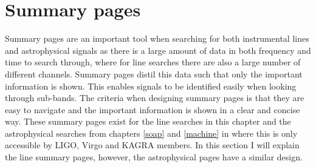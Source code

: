 \section{\label{detchar:summary}Summary pages}

Summary pages are an important tool when searching for both instrumental lines and astrophysical signals as there is a large amount of data in both frequency and time to search through, where for line searches there are also a large number of different channels. Summary pages
distil this data such that only the important information is shown. This
enables signals to be identified easily when looking through sub-bands. The
criteria when designing summary pages is that they are easy to navigate and the
important information is shown in a clear and concise way.  These summary pages exist
for the line searches in this chapter and the astrophysical searches from chapters \ref{soap} and \ref{machine} in \citep{bayleyHome} where this is only accessible by
\gls{LIGO}, Virgo and KAGRA members.
In this section I will explain the line summary pages, however, the astrophysical pages have a similar design.

